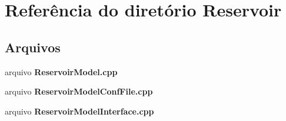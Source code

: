 \section{Referência do diretório Reservoir}
\label{dir_8a9c0fb172c9add828612884582c16a4}
\subsection*{Arquivos}
\begin{DoxyCompactItemize}
\item 
arquivo {\bf Reservoir\+Model.\+cpp}
\item 
arquivo {\bf Reservoir\+Model\+Conf\+File.\+cpp}
\item 
arquivo {\bf Reservoir\+Model\+Interface.\+cpp}
\end{DoxyCompactItemize}
